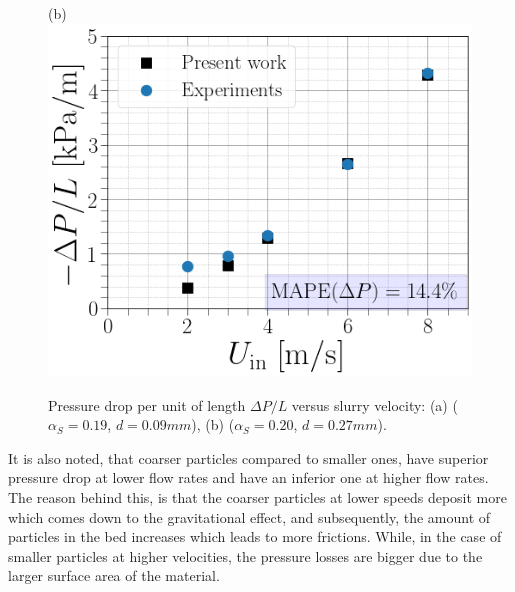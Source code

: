 \documentclass[11pt]{report}
\begin{document}
 \begin{figure}[ht!]
 \begin{center}
 (b)\includegraphics[scale = 0.3]{figs/DP27}
 \end{center}
 \end{figure}
\begin{figure}[ht!]
 \centering
 \caption{Pressure drop per unit of length $\Delta P/L$  versus slurry velocity: (a) ($\alpha_S=0.19$, $d=0.09 mm$), (b) ($\alpha_S=0.20$, $d=0.27 mm$).}
 \label{P}
 \end{figure}
 It is also noted, that coarser particles compared to smaller ones, have superior pressure drop at lower flow rates and have an inferior one at higher flow rates.  
 The reason behind this, is that the coarser particles at lower speeds deposit more which comes down to the gravitational effect, and subsequently, the amount of particles in the bed increases which leads to more frictions. 
 While, in the case of smaller particles at higher velocities, the  pressure losses are bigger due to the larger surface area of the material.
\end{document}
